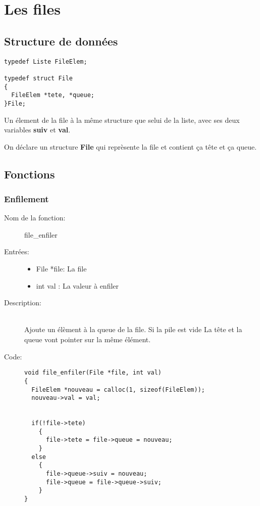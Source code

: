 \documentclass[a4paper]{article}
\begin{document}
\section{Les files}
\subsection{Structure de données}
\begin{lstlisting}
typedef Liste FileElem;

typedef struct File
{
  FileElem *tete, *queue;
}File;
\end{lstlisting}

Un élement de la file à la même structure que selui de la liste, avec ses deux
variables \textbf{suiv} et \textbf{val}.

On déclare un structure \textbf{File} qui reprèsente la file et contient ça
tête et ça queue.

\subsection{Fonctions}
\subsubsection{Enfilement}

\begin{description}
  \item[Nom de la fonction:] file\_enfiler

  \item[Entrées:] \hfill
    \begin{itemize}
      \item File *file: La file
      \item int val : La valeur à enfiler
    \end{itemize}

  \item[Description:] \hfill \\ 
    Ajoute un élèment à la queue de la file. Si la pile est vide La tête et la
    queue vont pointer sur la même élément.

  \item[Code:] \hfill 
  \begin{lstlisting}
void file_enfiler(File *file, int val)
{
  FileElem *nouveau = calloc(1, sizeof(FileElem));
  nouveau->val = val;


  if(!file->tete)
    {
      file->tete = file->queue = nouveau;
    }
  else
    {
      file->queue->suiv = nouveau;
      file->queue = file->queue->suiv;
    }
}
  \end{lstlisting}
\end{description}
\end{document}

